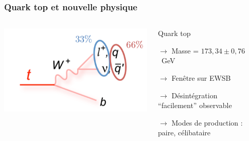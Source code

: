 \begin{frame}
\frametitle{Quark top et nouvelle physique}

\begin{columns}
\begin{column}{0.12\textwidth}
\hspace*{-1cm}
\includegraphics[width=2.2\textwidth]{Figures/FourTops/TopDecay.png}
\end{column}
\begin{column}{0.78\textwidth}
\begin{varblock}[8cm]{Quark top}
\begin{maliste}
\item[$\rightarrow$] Masse = $173,34\pm 0,76$~GeV
\item[$\rightarrow$] Fen\^etre sur EWSB
\item[$\rightarrow$] Désintégration ``facilement'' observable
\item[$\rightarrow$] Modes de production : paire, c\'elibataire
\end{maliste}
\end{varblock}
\end{column}
\hspace*{-1cm}
\begin{column}{0.1\textwidth}

\end{column}
\end{columns}
\end{frame}
